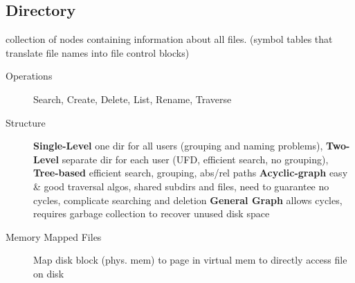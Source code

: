 \subsection*{Directory}
collection of nodes containing information about all files. (symbol tables that translate file names into file control blocks)
\begin{description}
    \item[Operations]Search, Create, Delete, List, Rename, Traverse
    \item[Structure] \textbf{Single-Level} one dir for all users (grouping and naming problems), \textbf{Two-Level} separate dir for each user (UFD, efficient search, no grouping), \textbf{Tree-based} efficient search, grouping, abs/rel paths \textbf{Acyclic-graph} easy \& good traversal algos, shared subdirs and files, need to guarantee no cycles, complicate searching and deletion \textbf{General Graph} allows cycles, requires garbage collection to recover unused disk space %
    \item[Memory Mapped Files] Map disk block (phys. mem) to page in virtual mem to directly access file on disk
\end{description}

